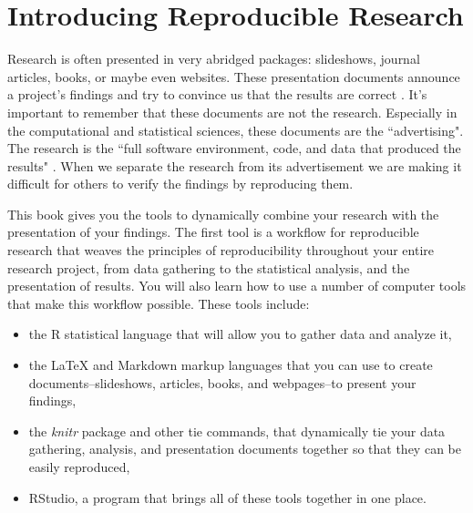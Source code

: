 



\chapter{Introducing Reproducible Research}\label{Intro}

Research is often presented in very abridged packages: slideshows, journal articles, books, or maybe even websites. These presentation documents announce a project's findings and try to convince us that the results are correct \cite[]{Mesirov2010}. It's important to remember that these documents are not the research. Especially in the computational and statistical sciences, these documents are the ``advertising". The research is the ``full software environment, code, and data that produced the results" \cite[385]{Buckheit1995,Donoho2010}. When we separate the research from its advertisement we are making it difficult for others to verify the findings by reproducing them. 

This book gives you the tools to dynamically combine your research with the presentation of your findings. The first tool is a workflow for reproducible research that weaves the principles of reproducibility throughout your entire research project, from data gathering to the statistical analysis, and the presentation of results. You will also learn how to use a number of computer tools that make this workflow possible. These tools include:

\begin{itemize}
    \item the R statistical language that will allow you to gather data and analyze it,
    \item the LaTeX and Markdown markup languages that you can use to create documents--slideshows, articles, books, and webpages--to present your findings,
    \item the {\emph{knitr}} package and other tie commands, that dynamically tie your data gathering, analysis, and presentation documents together so that they can be easily reproduced,
    \item RStudio, a program that brings all of these tools together in one place.
\end{itemize}


